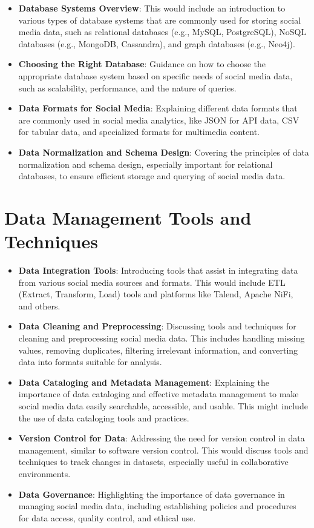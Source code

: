 \documentclass[
]{book}
\providecommand{\tightlist}{%
  \setlength{\itemsep}{0pt}\setlength{\parskip}{0pt}}
\begin{document}
\begin{itemize}
\tightlist
\item
  \textbf{Database Systems Overview}: This would include an introduction to various types of database systems that are commonly used for storing social media data, such as relational databases (e.g., MySQL, PostgreSQL), NoSQL databases (e.g., MongoDB, Cassandra), and graph databases (e.g., Neo4j).
\item
  \textbf{Choosing the Right Database}: Guidance on how to choose the appropriate database system based on specific needs of social media data, such as scalability, performance, and the nature of queries.
\item
  \textbf{Data Formats for Social Media}: Explaining different data formats that are commonly used in social media analytics, like JSON for API data, CSV for tabular data, and specialized formats for multimedia content.
\item
  \textbf{Data Normalization and Schema Design}: Covering the principles of data normalization and schema design, especially important for relational databases, to ensure efficient storage and querying of social media data.
\end{itemize}

\hypertarget{data-management-tools-and-techniques}{%
\section*{Data Management Tools and Techniques}\label{data-management-tools-and-techniques}}

\begin{itemize}
\tightlist
\item
  \textbf{Data Integration Tools}: Introducing tools that assist in integrating data from various social media sources and formats. This would include ETL (Extract, Transform, Load) tools and platforms like Talend, Apache NiFi, and others.
\item
  \textbf{Data Cleaning and Preprocessing}: Discussing tools and techniques for cleaning and preprocessing social media data. This includes handling missing values, removing duplicates, filtering irrelevant information, and converting data into formats suitable for analysis.
\item
  \textbf{Data Cataloging and Metadata Management}: Explaining the importance of data cataloging and effective metadata management to make social media data easily searchable, accessible, and usable. This might include the use of data cataloging tools and practices.
\item
  \textbf{Version Control for Data}: Addressing the need for version control in data management, similar to software version control. This would discuss tools and techniques to track changes in datasets, especially useful in collaborative environments.
\item
  \textbf{Data Governance}: Highlighting the importance of data governance in managing social media data, including establishing policies and procedures for data access, quality control, and ethical use.
\end{itemize}
\end{document}
